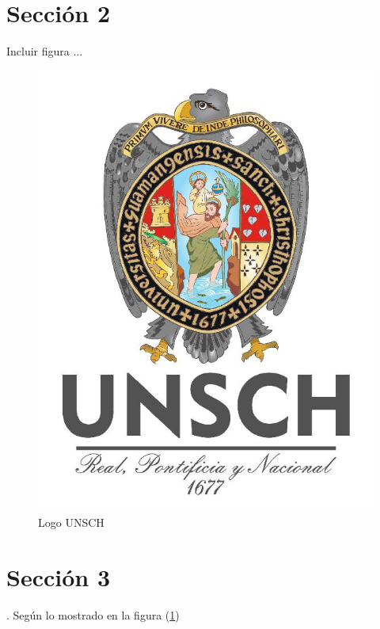 \documentclass[12pt,a4paper]{article} %
\begin{document}
    \section{Sección 2}
        Incluir figura ...
        \begin{figure}[H]
            \centering
            \includegraphics[scale = 0.5]{logo-unsch.jpg}
            \caption{Logo UNSCH}
            \label{fig:logo-unsch}
        \end{figure}
    \section{Sección 3}
        \lipsum[1].
        Según lo mostrado en la figura (\ref{fig:logo-unsch})
\end{document}
